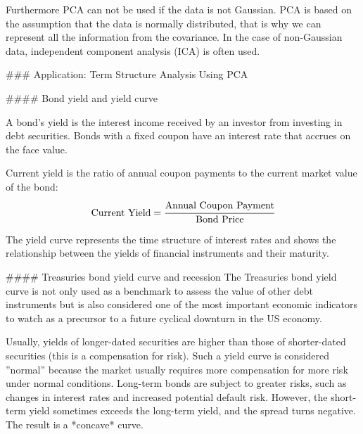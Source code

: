 \begin{enumerate}
Furthermore PCA can not be used if the data is not Gaussian. PCA is based on the assumption that the data is normally distributed, that is why we can represent all the information from the covariance. In the case of non-Gaussian data, independent component analysis (ICA) is often used.

### Application: Term Structure Analysis Using PCA

#### Bond yield and yield curve

A bond’s yield is the interest income received by an investor from investing in debt securities. Bonds with a fixed coupon have an interest rate that accrues on the face value.

Current yield is the ratio of annual coupon payments to the current
market value of the bond:
$$
\text{Current Yield} = \cfrac{\text{Annual Coupon Payment}}{\text{Bond Price}}
$$

The yield curve represents the time structure of interest rates and shows the relationship between the yields of financial instruments and their maturity.



#### Treasuries bond yield curve and recession
The Treasuries bond yield curve is not only used as a benchmark to assess the value of other debt instruments but is also considered one of the most important economic indicators to watch as a precursor to a future cyclical downturn in the US economy.

Usually, yields of longer-dated securities are higher than those of shorter-dated securities (this is a compensation for risk).
Such a yield curve is considered ”normal” because the market usually requires more compensation for more risk under normal conditions. Long-term bonds are subject to greater risks, such as changes in interest rates and increased potential default risk.
However, the short-term yield sometimes exceeds the long-term yield, and the spread turns negative. The result is a *concave* curve.



\end{enumerate}
